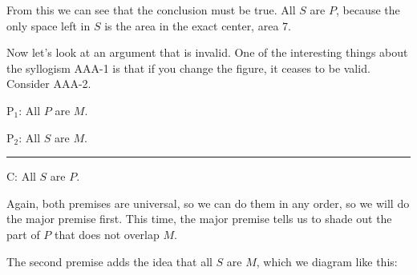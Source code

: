 From this we can see that the conclusion must be true. All $S$ are $P$, because the only space left in $S$ is the area in the exact center, area 7.

Now let's look at an argument that is invalid. One of the interesting things about the syllogism AAA-1 is that if you change the figure, it ceases to be valid. Consider AAA-2.

\begin{earg}
\item[P$_1$:] All $P$ are $M$.
\item[P$_2$:] All $S$ are $M$.
\vspace{-.5em}
\item [] \rule{0.2\linewidth}{.5pt} 
\item[C:] All $S$ are $P$.
\end{earg}

Again, both premises are universal, so we can do them in any order, so we will do the major premise first. This time, the major premise tells us to shade out the part of $P$ that does not overlap $M$.

\begin{center}
\end{center}

The second premise adds the idea that all $S$ are $M$, which we diagram like this:

\begin{center}
\end{center}

